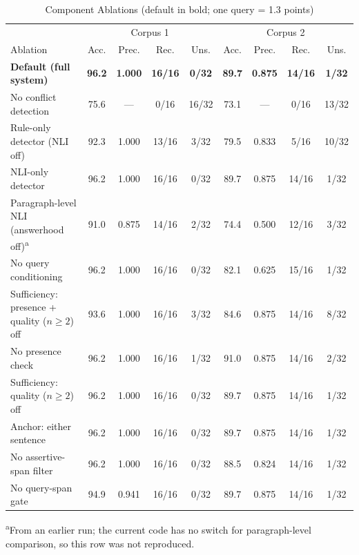 \documentclass[conference]{IEEEtran}
\begin{document}
\begin{table}[t]
\caption{Component Ablations (default in bold; one query = 1.3 points)}
\label{tab:component_ablation}
\centering
\small
\begin{tabular}{l c c c c c c c c}
\toprule
 & \multicolumn{4}{c}{Corpus 1} & \multicolumn{4}{c}{Corpus 2} \\
Ablation & Acc. & Prec. & Rec. & Uns. & Acc. & Prec. & Rec. & Uns. \\
\midrule
\textbf{Default (full system)} & \textbf{96.2} & \textbf{1.000} & \textbf{16/16} & \textbf{0/32}
                               & \textbf{89.7} & \textbf{0.875} & \textbf{14/16} & \textbf{1/32} \\
No conflict detection                 & 75.6 & ---   & 0/16  & 16/32 & 73.1 & ---   & 0/16  & 13/32 \\
Rule-only detector (NLI off)          & 92.3 & 1.000 & 13/16 & 3/32  & 79.5 & 0.833 & 5/16  & 10/32 \\
NLI-only detector                     & 96.2 & 1.000 & 16/16 & 0/32  & 89.7 & 0.875 & 14/16 & 1/32 \\
Paragraph-level NLI (answerhood off)\textsuperscript{a} & 91.0 & 0.875 & 14/16 & 2/32  & 74.4 & 0.500 & 12/16 & 3/32 \\
No query conditioning                 & 96.2 & 1.000 & 16/16 & 0/32  & 82.1 & 0.625 & 15/16 & 1/32 \\
Sufficiency: presence + quality ($n\geq2$) off & 93.6 & 1.000 & 16/16 & 3/32 & 84.6 & 0.875 & 14/16 & 8/32 \\
No presence check                     & 96.2 & 1.000 & 16/16 & 1/32  & 91.0 & 0.875 & 14/16 & 2/32 \\
Sufficiency: quality ($n\geq2$) off   & 96.2 & 1.000 & 16/16 & 0/32  & 89.7 & 0.875 & 14/16 & 1/32 \\
Anchor: either sentence               & 96.2 & 1.000 & 16/16 & 0/32  & 89.7 & 0.875 & 14/16 & 1/32 \\
No assertive-span filter              & 96.2 & 1.000 & 16/16 & 0/32  & 88.5 & 0.824 & 14/16 & 1/32 \\
No query-span gate                    & 94.9 & 0.941 & 16/16 & 0/32  & 89.7 & 0.875 & 14/16 & 1/32 \\
\bottomrule
\end{tabular}

\vspace{3pt}
\raggedright\scriptsize
\textsuperscript{a}From an earlier run; the current code has no switch for
paragraph-level comparison, so this row was not reproduced.
\end{table}
\end{document}
